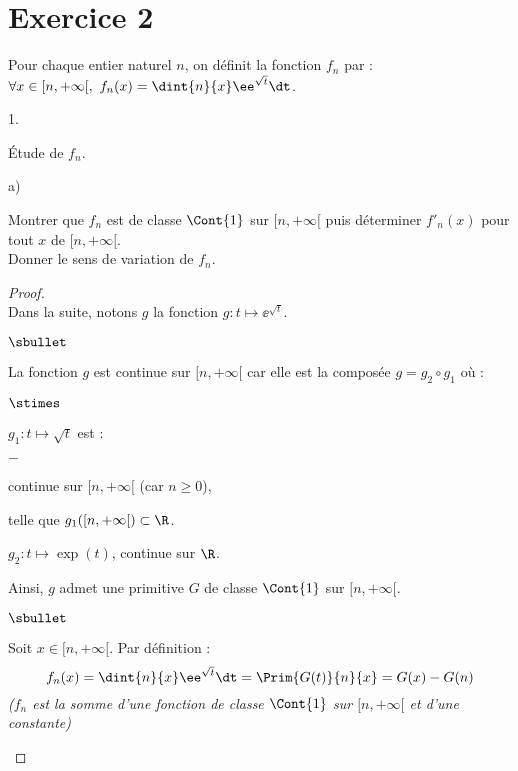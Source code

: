 \section*{Exercice 2}
\noindent
Pour chaque entier naturel $n$, on définit la fonction $f_{n}$ par :
$\forall x\in[n, + \infty[, \ f_{n}(x) = \dint{n}{x} \ee^{\sqrt{t}} \dt$.
\begin{noliste}{1.}
  \setlength{\itemsep}{4mm}
\item Étude de $f_{n}$.
  \begin{noliste}{a)}
    \setlength{\itemsep}{2mm}
  \item Montrer que $f_{n}$ est de classe $\Cont{1}$ sur $[n, +
    \infty[$ puis déterminer $f'_{n}(x)$ pour tout $x$ de $[n,
    +\infty[$.\\
    Donner le sens de variation de $f_{n}$.

    \begin{proof}~\\%
      Dans la suite, notons $g$ la fonction $g : t \mapsto
      \ee^{\sqrt{t}}$.
      \begin{noliste}{$\sbullet$}
      \item La fonction $g$ est continue sur $[n, +\infty[$ car elle
        est la composée $g = g_2 \circ g_1$ où :
      \end{noliste}
      \begin{noliste}{$\stimes$}
      \item $g_1 : t \mapsto \sqrt{t}$ est :
        \begin{liste}{$-$}
        \item continue sur $[n, +\infty[$ (car $n \geq 0$),
        \item telle que $g_1([n, +\infty[) \subset \R$.
        \end{liste}
      \item $g_2 : t \mapsto \exp(t)$, continue sur $\R$.
      \end{noliste}
      Ainsi, $g$ admet une primitive $G$ de classe $\Cont{1}$ sur $[n,
      +\infty[$.
      \begin{noliste}{$\sbullet$}
      \item Soit $x \in [n, +\infty[$. Par définition :
        \[
        f_n(x) = \dint{n}{x} \ee^{\sqrt{t}} \dt = \Prim{G(t)}{n}{x} =
        G(x)- G(n)
        \]        
        \conc{La fonction $f_n$ est de classe $\Cont{1}$ sur
          $[n,+\infty[$ car $G$ l'est.}%
        {\it ($f_n$ est la somme d'une fonction de classe $\Cont{1}$
          sur $[n,+\infty[$ et d'une constante)}%


\end{noliste}
\end{proof}
\end{noliste}
\end{noliste}
